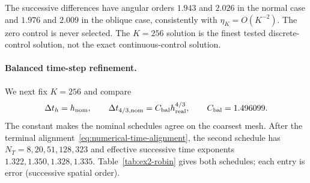 \documentclass[11pt]{article}
\theoremstyle{definition}
\theoremstyle{remark}
\begin{document}
The successive differences have angular orders $1.943$ and $2.026$ in the
normal case and $1.976$ and $2.009$ in the oblique case, consistently with
$\eta_K=O(K^{-2})$.  The zero control is never selected.  The $K=256$
solution is the finest tested discrete-control solution, not the exact
continuous-control solution.

\paragraph{Balanced time-step refinement.}
We next fix $K=256$ and compare
\[
 \Delta t_h=h_{\rm nom},\qquad
 \Delta t_{4/3,\rm nom}=C_{\rm bal} h_{\rm real}^{4/3},
 \qquad C_{\rm bal}=1.496099.
\]
The constant makes the nominal schedules agree on the coarsest mesh.  After
the terminal alignment~\eqref{eq:numerical-time-alignment}, the second
schedule has $N_T=8,20,51,128,323$ and effective successive time exponents
$1.322,1.350,1.328,1.335$.  Table~\ref{tab:ex2-robin} gives both schedules;
each entry is error (successive spatial order).
\end{document}
